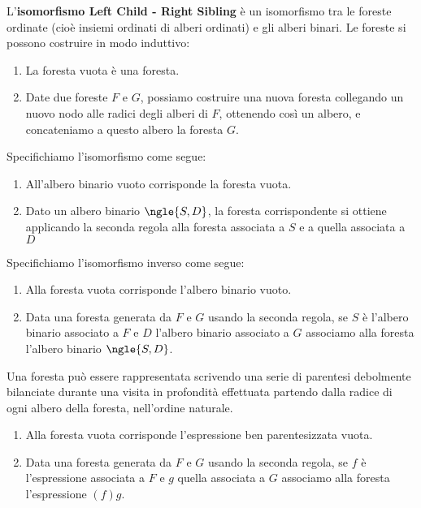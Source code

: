 \documentclass[\main/main.tex]{subfiles}
\begin{document}
\begin{definition}
    L'\textbf{isomorfismo Left Child - Right Sibling} è un isomorfismo tra le foreste ordinate (cioè insiemi ordinati di alberi ordinati) e gli alberi binari. Le foreste si possono costruire in modo induttivo:
    \begin{enumerate}
        \item La foresta vuota è una foresta.
        \item Date due foreste \(F\) e \(G\), possiamo costruire una nuova foresta collegando un nuovo nodo alle radici degli alberi di \(F\), ottenendo così un albero, e concateniamo a questo albero la foresta \(G\).
    \end{enumerate}
    Specifichiamo l'isomorfismo come segue:
    \begin{enumerate}
        \item All'albero binario vuoto corrisponde la foresta vuota.
        \item Dato un albero binario \(\ngle{S, D}\), la foresta corrispondente si ottiene applicando la seconda regola alla foresta associata a \(S\) e a quella associata a \(D\)
    \end{enumerate}
    Specifichiamo l'isomorfismo inverso come segue:
    \begin{enumerate}
        \item Alla foresta vuota corrisponde l'albero binario vuoto.
        \item Data una foresta generata da \(F\) e \(G\) usando la seconda regola, se \(S\) è l'albero binario associato a \(F\) e \(D\) l'albero binario associato a \(G\) associamo alla foresta l'albero binario \(\ngle{S, D}\).
    \end{enumerate}
\end{definition}
\begin{definition}
    Una foresta può essere rappresentata scrivendo una serie di parentesi debolmente bilanciate durante una visita in profondità effettuata partendo dalla radice di ogni albero della foresta, nell'ordine naturale.
    \begin{enumerate}
        \item Alla foresta vuota corrisponde l'espressione ben parentesizzata vuota.
        \item Data una foresta generata da \(F\) e \(G\) usando la seconda regola, se \(f\) è l'espressione associata a \(F\) e \(g\) quella associata a \(G\) associamo alla foresta l'espressione \((f)g\).
    \end{enumerate}
\end{definition}
\end{document}
